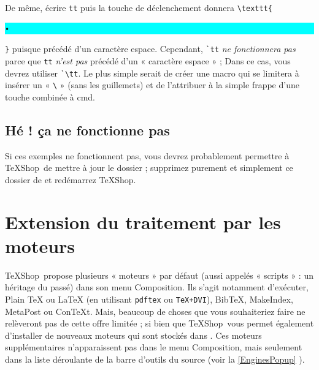 \documentclass[11pt,french]{article}
\newcommand{\TS}{\textsf{\TeX Shop}}
\newcommand{\mnu}[1]{\textsf{#1}}
\newcommand{\selmark}{\colorbox{cyan}{\rule[-0.5ex]{0ex}{2.1ex}\texttt{•}}}
\begin{document}

De même, écrire \verb+tt+ puis la touche de déclenchement donnera \verb+\texttt{+\selmark\verb+}+ puisque précédé d'un caractère espace. Cependant, \verb+`tt+ \emph{ne fonctionnera pas} parce que \verb+tt+ \emph{n'est pas} précédé d'un « caractère espace » ; Dans ce cas, vous devrez utiliser \verb+`\tt+. Le plus simple serait de créer une macro qui se limitera à insérer un « \verb+\+ » (sans les guillemets) et de l'attribuer à la simple frappe d'une touche combinée à \mnu{cmd}.

\subsection{Hé ! ça ne fonctionne pas}

Si ces exemples ne fonctionnent pas, vous devrez probablement permettre à \TS\ de mettre à jour le dossier  ; supprimez purement et simplement ce dossier de  et redémarrez \TS.



\section{Extension du traitement par les moteurs}

\TS\ propose plusieurs « moteurs » par défaut (aussi appelés « scripts » : un héritage du passé) dans son menu \mnu{Composition}. Ils s'agit notamment d'exécuter, \mnu{Plain TeX} ou \mnu{LaTeX} (en utilisant \texttt{pdftex} ou \texttt{TeX+DVI}), \mnu{BibTeX},  \mnu{MakeIndex}, \mnu{MetaPost} ou \mnu{ConTeXt}. Mais, beaucoup de choses que vous souhaiteriez faire ne relèveront pas de cette offre limitée ; si bien que \TS\ vous permet également d'installer de nouveaux moteurs qui sont stockés dans . Ces moteurs supplémentaires n'apparaissent pas dans le menu \mnu{Composition}, mais seulement dans la liste déroulante de la barre d'outils du source (voir la \cref{EnginesPopup} ).
\end{document}
